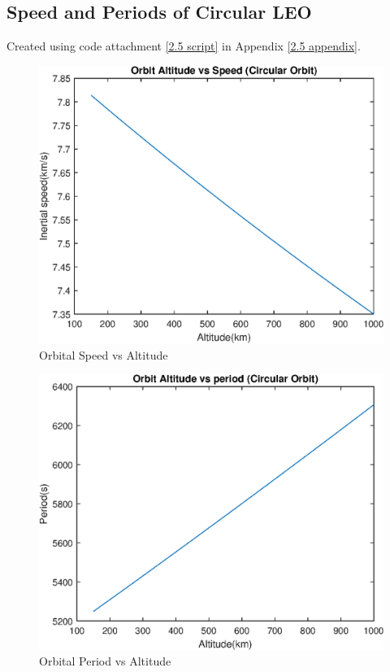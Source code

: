 \documentclass[hidelinks, 12pt]{article}%
\begin{document}
    \subsection{Speed and Periods of Circular LEO}
    \label{question 2.5}
Created using code attachment \ref{2.5 script} in Appendix \ref{2.5 appendix}.
\begin{figure}[H]
    \begin{centering}
        \includegraphics[width=\textwidth]{output_files/2.5/Orbit_Altitude_vs_Velocity.eps}
        \caption{Orbital Speed vs Altitude}
        \label{2.5 altitude vs speed circular LEO}
    \end{centering}
\end{figure}
    
\begin{figure}[H]
    \begin{centering}
        \includegraphics[width=\textwidth]{output_files/2.5/Orbit_Altitude_vs_period.eps}
        \caption{Orbital Period vs Altitude}
        \label{2.5 altitude vs period circular LEO}
    \end{centering}
\end{figure}
        
\end{document}
